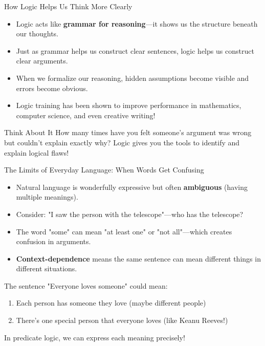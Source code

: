 \documentclass{beamer}
\begin{document}
	\begin{frame}{How Logic Helps Us Think More Clearly}
		\begin{itemize}
			\item Logic acts like \textbf{grammar for reasoning}—it shows us the structure beneath our thoughts.
			\item Just as grammar helps us construct clear sentences, logic helps us construct clear arguments.
			\item When we formalize our reasoning, hidden assumptions become visible and errors become obvious.
			\item Logic training has been shown to improve performance in mathematics, computer science, and even creative writing!
		\end{itemize}
		
		\begin{alertblock}{Think About It}
			How many times have you felt someone's argument was wrong but couldn't explain exactly why? Logic gives you the tools to identify and explain logical flaws!
		\end{alertblock}
	\end{frame}
	
	\begin{frame}{The Limits of Everyday Language: When Words Get Confusing}
		\begin{itemize}
			\item Natural language is wonderfully expressive but often \textbf{ambiguous} (having multiple meanings).
			\item Consider: "I saw the person with the telescope"—who has the telescope?
			\item The word "some" can mean "at least one" or "not all"—which creates confusion in arguments.
			\item \textbf{Context-dependence} means the same sentence can mean different things in different situations.
		\end{itemize}
		
		\begin{example}
			The sentence "Everyone loves someone" could mean:
			\begin{enumerate}
				\item Each person has someone they love (maybe different people)
				\item There's one special person that everyone loves (like Keanu Reeves!)
			\end{enumerate}
			In predicate logic, we can express each meaning precisely!
		\end{example}
	\end{frame}
	
\end{document}
